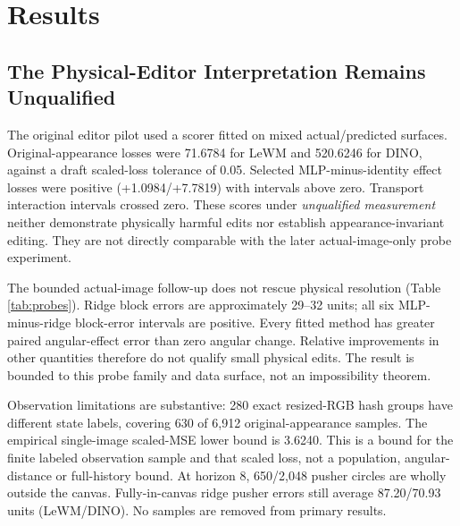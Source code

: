 \section{Results}
\label{sec:results}

\subsection{The Physical-Editor Interpretation Remains Unqualified}
\label{sec:measurement}
The original editor pilot used a scorer fitted on mixed actual/predicted
surfaces. Original-appearance losses were 71.6784 for LeWM and 520.6246 for
DINO, against a draft scaled-loss tolerance of 0.05. Selected MLP-minus-identity
effect losses were positive (+1.0984/+7.7819) with intervals above zero.
Transport interaction intervals crossed zero. These scores under
\emph{unqualified measurement} neither demonstrate physically harmful edits nor
establish appearance-invariant editing. They are not directly comparable with
the later actual-image-only probe experiment.

\begin{table}[t]
\caption{Discovery actual-image follow-up, original appearance/horizon 8.
Block errors are native distance units; angles are degrees. All MLP seeds are
retained. Paired angular-effect error is worse than zero change for every fitted
method. Probe failures do not prove absence of physical information.}
\label{tab:probes}
\centering
\small

\end{table}

The bounded actual-image follow-up does not rescue physical resolution
(Table \ref{tab:probes}). Ridge block errors are approximately 29--32 units;
all six MLP-minus-ridge block-error intervals are positive. Every fitted
method has greater paired angular-effect error than zero angular change.
Relative improvements in other quantities therefore do not qualify small
physical edits. The result is bounded to this probe family and data surface,
not an impossibility theorem.

Observation limitations are substantive: 280 exact resized-RGB hash groups have
different state labels, covering 630 of 6,912 original-appearance samples.
The empirical single-image scaled-MSE lower bound is 3.6240. This is a bound
for the finite labeled observation sample and that scaled loss, not a population,
angular-distance or full-history bound. At horizon 8, 650/2,048 pusher circles
are wholly outside the canvas. Fully-in-canvas ridge pusher errors still average
87.20/70.93 units (LeWM/DINO). No samples are removed from primary results.

